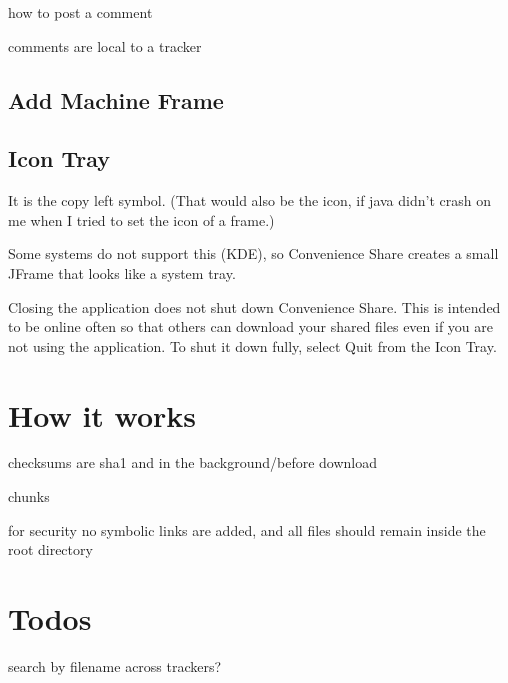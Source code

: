 \documentclass{article}
\begin{document}
how to post a comment

comments are local to a tracker

\subsection{Add Machine Frame}

\subsection{Icon Tray}

It is the copy left symbol.
(That would also be the icon, if java didn't crash on me when I tried to set the icon of a frame.)

Some systems do not support this (KDE), so Convenience Share creates a small JFrame that looks like a system tray.

Closing the application does not shut down Convenience Share.
This is intended to be online often so that others can download your shared files even if you are not using the application.
To shut it down fully, select Quit from the Icon Tray.

\section{How it works}

checksums are sha1 and in the background/before download

chunks

for security no symbolic links are added, and all files should remain inside the root directory


\section {Todos}
search by filename across trackers?
\end{document}
